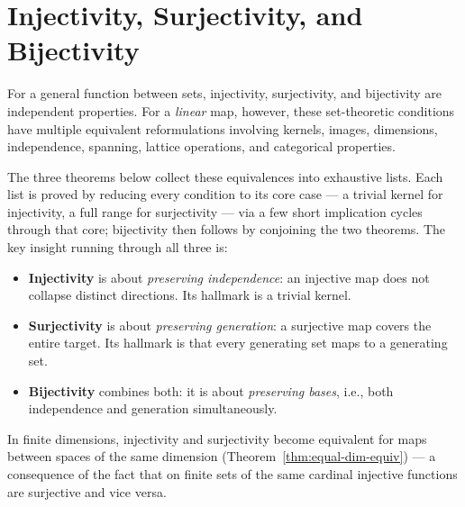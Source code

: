 
\newpage
\section{Injectivity, Surjectivity, and Bijectivity}
\label{sec:inj-surj-bij}

\begin{remark}[Overview]
    For a general function between sets, injectivity, surjectivity, and bijectivity are
    independent properties. For a \emph{linear} map, however, these set-theoretic conditions
    have multiple equivalent reformulations involving kernels, images, dimensions,
    independence, spanning, lattice operations, and categorical properties.

    The three theorems below collect these equivalences into exhaustive lists. Each list is
    proved by reducing every condition to its core case --- a trivial kernel for injectivity,
    a full range for surjectivity --- via a few short implication cycles through that core;
    bijectivity then follows by conjoining the two theorems.
    The key insight running through all three is:
    \begin{itemize}
        \item \textbf{Injectivity} is about \emph{preserving independence}: an injective
              map does not collapse distinct directions. Its hallmark is a trivial kernel.
        \item \textbf{Surjectivity} is about \emph{preserving generation}: a surjective
              map covers the entire target. Its hallmark is that every generating set maps
              to a generating set.
        \item \textbf{Bijectivity} combines both: it is about \emph{preserving bases},
              i.e., both independence and generation simultaneously.
    \end{itemize}
    In finite dimensions, injectivity and surjectivity become equivalent for maps between
    spaces of the same dimension (Theorem~\ref{thm:equal-dim-equiv}) --- a consequence of
    the fact that on finite sets of the same cardinal injective functions are surjective and vice versa.
\end{remark}

